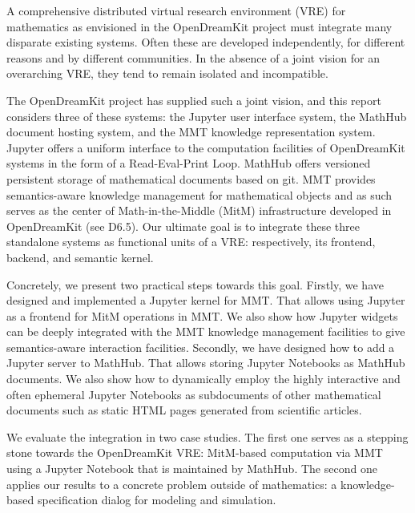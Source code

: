 A comprehensive distributed virtual research environment (VRE) for mathematics as envisioned in the OpenDreamKit project must integrate many disparate existing systems.
Often these are developed independently, for different reasons and by different communities.
In the absence of a joint vision for an overarching VRE, they tend to remain isolated and incompatible.

The OpenDreamKit project has supplied such a joint vision, and this report considers three of these systems: the Jupyter user interface system, the MathHub document hosting system, and the MMT knowledge representation system.
Jupyter offers a uniform interface to the computation facilities of OpenDreamKit systems in the form of a Read-Eval-Print Loop.
MathHub offers versioned persistent storage of mathematical documents based on git.
MMT provides semantics-aware knowledge management for mathematical objects and as such serves as the center of Math-in-the-Middle (MitM) infrastructure developed in OpenDreamKit (see D6.5).
Our ultimate goal is to integrate these three standalone systems as functional units of a VRE: respectively, its frontend, backend, and semantic kernel.

Concretely, we present two practical steps towards this goal.
Firstly, we have designed and implemented a Jupyter kernel for MMT.
That allows using Jupyter as a frontend for MitM operations in MMT.
We also show how Jupyter widgets can be deeply integrated with the MMT knowledge management facilities to give semantics-aware interaction facilities.
Secondly, we have designed how to add a Jupyter server to MathHub.
That allows storing Jupyter Notebooks as MathHub documents.
We also show how to dynamically employ the highly interactive and often ephemeral Jupyter Notebooks as subdocuments of other mathematical documents such as static HTML pages generated from scientific articles.

We evaluate the integration in two case studies.
The first one serves as a stepping stone towards the OpenDreamKit VRE: MitM-based computation via MMT using a Jupyter Notebook that is maintained by MathHub.
The second one applies our results to a concrete problem outside of mathematics: a knowledge-based specification dialog for modeling and simulation.